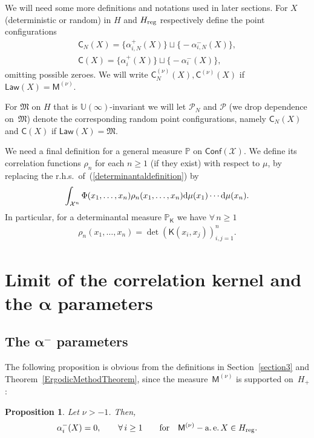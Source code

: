 \documentclass[pdftex]{sigma}
\numberwithin{equation}{section}
\newtheorem{Proposition}[Theorem]{Proposition}
{ \theoremstyle{definition}
\newtheorem{Definition}[Theorem]{Definition}
\newtheorem{Remark}[Theorem]{Remark} }
\begin{document}
We will need some more definitions and notations used in later sections. For $X$ (deterministic or random) in $H$ and $H_{{\rm reg}}$ respectively define the point configurations
\begin{gather*}
\mathsf{C}_N(X) =\big\{\alpha_{i,N}^{+}(X)\big\} \sqcup \big\{{-}\alpha_{i,N}^{-}(X)\big\}, \\
\mathsf{C}(X) =\big\{\alpha_{i}^{+}(X)\big\} \sqcup \big\{{-}\alpha_{i}^{-}(X)\big\},
\end{gather*}
omitting possible zeroes. We will write $\mathsf{C}^{(\nu)}_N(X), \mathsf{C}^{(\nu)}(X)$ if $\mathsf{Law}(X)=\mathsf{M}^{(\nu)}$.

For $\mathfrak{M}$ on $H$ that is $\mathbb{U}(\infty)$-invariant we will let $\mathcal{P}_N$ and $\mathcal{P}$ (we drop dependence on~$\mathfrak{M}$) denote the corresponding random point configurations, namely $\mathsf{C}_N(X)$ and $\mathsf{C}(X)$ if $\mathsf{Law}(X)=\mathfrak{M}$.


We need a final definition for a general measure $\mathbb{P}$ on $\mathsf{Conf}(\mathcal{X})$. We define its correlation functions $\rho_n$ for each $n\ge 1$ (if they exist) with respect to $\mu$, by replacing the r.h.s.\ of~(\ref{determinantaldefinition}) by
\begin{gather*}
\int_{\mathcal{X}^n}^{}\Phi(x_1,\dots,x_n) \rho_n(x_1,\dots,x_n){\rm d}\mu(x_1) \cdots {\rm d}\mu(x_n).
\end{gather*}
In particular, for a determinantal measure $\mathbb{P}_{\mathsf{K}}$ we have $\forall\, n \ge 1$
\begin{gather*}
\rho_n(x_1,\dots,x_n)=\det (\mathsf{K}(x_i,x_j) )_{i,j=1}^n.
\end{gather*}

\section[Limit of the correlation kernel and the $\alpha$ parameters]{Limit of the correlation kernel and the $\boldsymbol{\alpha}$ parameters}\label{section4}
\subsection[The $\alpha^-$ parameters]{The $\boldsymbol{\alpha^-}$ parameters}\label{section4.1}
The following proposition is obvious from the definitions in Section~\ref{section3} and Theorem~\ref{ErgodicMethodTheorem}, since the measure~$\mathsf{M}^{(\nu)}$ is supported on~$H_+$:
\begin{Proposition}\label{PropositionAlphaMinus}
Let $\nu>-1$. Then,
\begin{gather*}
\alpha_i^-(X)=0,\qquad \forall\, i\ge 1 \qquad \text{for} \quad \mathsf{M}^{(\nu)}-\operatorname{a.e.} X \in H_{{\rm reg}}.
\end{gather*}
\end{Proposition}
\end{document}
